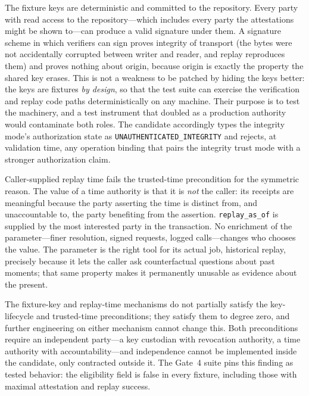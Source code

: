 The fixture keys are deterministic and committed to the repository. Every party with read access to the repository---which includes every party the attestations might be shown to---can produce a valid signature under them. A signature scheme in which verifiers can sign proves integrity of transport (the bytes were not accidentally corrupted between writer and reader, and replay reproduces them) and proves nothing about origin, because origin is exactly the property the shared key erases. This is not a weakness to be patched by hiding the keys better: the keys are fixtures \emph{by design}, so that the test suite can exercise the verification and replay code paths deterministically on any machine. Their purpose is to test the machinery, and a test instrument that doubled as a production authority would contaminate both roles. The candidate accordingly types the integrity mode's authorization state as \texttt{UNAUTHENTICATED\_INTEGRITY} and rejects, at validation time, any operation binding that pairs the integrity trust mode with a stronger authorization claim.

Caller-supplied replay time fails the trusted-time precondition for the symmetric reason. The value of a time authority is that it is \emph{not} the caller: its receipts are meaningful because the party asserting the time is distinct from, and unaccountable to, the party benefiting from the assertion. \texttt{replay\_as\_of} is supplied by the most interested party in the transaction. No enrichment of the parameter---finer resolution, signed requests, logged calls---changes who chooses the value. The parameter is the right tool for its actual job, historical replay, precisely because it lets the caller ask counterfactual questions about past moments; that same property makes it permanently unusable as evidence about the present.

\begin{finding}\label{elig:find:impossible}
The fixture-key and replay-time mechanisms do not partially satisfy the key-lifecycle and trusted-time preconditions; they satisfy them to degree zero, and further engineering on either mechanism cannot change this. Both preconditions require an independent party---a key custodian with revocation authority, a time authority with accountability---and independence cannot be implemented inside the candidate, only contracted outside it. The Gate~4 suite pins this finding as tested behavior: the eligibility field is false in every fixture, including those with maximal attestation and replay success.
\end{finding}

